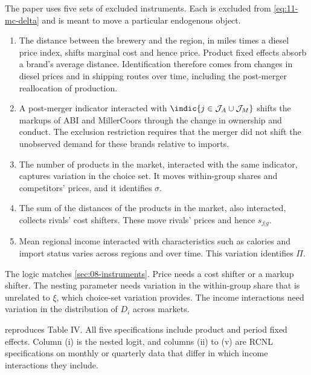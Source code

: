 The paper uses five sets of excluded instruments. Each is excluded from \eqref{eq:11-mc-delta} and is meant to
move a particular endogenous object.
\begin{enumerate}[label=(\roman*)]
\item The distance between the brewery and the region, in miles times a diesel price index, shifts marginal cost
and hence price. Product fixed effects absorb a brand's average distance. Identification therefore comes from changes
in diesel prices and in shipping routes over time, including the post-merger reallocation of production.
\item A post-merger indicator interacted with $\indic\{j \in \mathcal{J}_A \cup \mathcal{J}_M\}$ shifts the markups
of ABI and MillerCoors through the change in ownership and conduct. The exclusion restriction requires that the merger
did not shift the unobserved demand for these brands relative to imports.
\item The number of products in the market, interacted with the same indicator, captures variation in the choice
set. It moves within-group shares and competitors' prices, and it identifies $\sigma$.
\item The sum of the distances of the products in the market, also interacted, collects rivals' cost shifters.
These move rivals' prices and hence $s_{j|g}$.
\item Mean regional income interacted with characteristics such as calories and import status varies across regions
and over time. This variation identifies $\Pi$.
\end{enumerate}
The logic matches \cref{sec:08-instruments}. Price needs a cost shifter or a markup shifter. The nesting parameter
needs variation in the within-group share that is unrelated to $\xi$, which choice-set variation provides. The
income interactions need variation in the distribution of $D_i$ across markets.

 reproduces Table IV. All five specifications include product and period fixed effects.
Column (i) is the nested logit, and columns (ii) to (v) are RCNL specifications on monthly or quarterly data that
differ in which income interactions they include.

